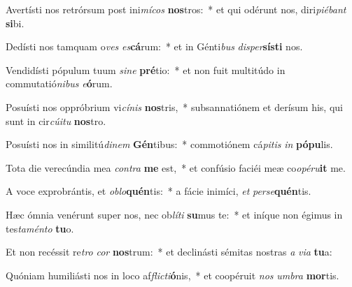 \item Avertísti nos retrórsum post ini\textit{mí}\textit{cos} \textbf{nos}tros:~* et qui odérunt nos, diri\textit{pi}\textit{é}\textit{bant} \textbf{si}bi.
\item Dedísti nos tamquam o\textit{ves} \textit{es}\textbf{cá}rum:~* et in Génti\textit{bus} \textit{di}\textit{sper}\textbf{sís}\textbf{ti} nos.
\item Vendidísti pópulum tuum \textit{si}\textit{ne} \textbf{pré}tio:~* et non fuit multitúdo in commutatió\textit{ni}\textit{bus} \textit{e}\textbf{ó}rum.
\item Posuísti nos oppróbrium vi\textit{cí}\textit{nis} \textbf{nos}tris,~* subsannatiónem et derísum his, qui sunt in cir\textit{cú}\textit{i}\textit{tu} \textbf{nos}tro.
\item Posuísti nos in similitú\textit{di}\textit{nem} \textbf{Gén}tibus:~* commotiónem cá\textit{pi}\textit{tis} \textit{in} \textbf{pó}\textbf{pu}lis.
\item Tota die verecúndia mea \textit{con}\textit{tra} \textbf{me} est,~* et confúsio faciéi meæ co\textit{o}\textit{pé}\textit{ru}\textbf{it} me.
\item A voce exprobrántis, et \textit{ob}\textit{lo}\textbf{quén}tis:~* a fácie inimíci, \textit{et} \textit{per}\textit{se}\textbf{quén}tis.
\item Hæc ómnia venérunt super nos, nec ob\textit{lí}\textit{ti} \textbf{su}mus te:~* et iníque non égimus in tes\textit{ta}\textit{mén}\textit{to} \textbf{tu}o.
\item Et non recéssit re\textit{tro} \textit{cor} \textbf{nos}trum:~* et declinásti sémitas nostras \textit{a} \textit{vi}\textit{a} \textbf{tu}a:
\item Quóniam humiliásti nos in loco af\textit{flic}\textit{ti}\textbf{ó}nis,~* et coopéruit \textit{nos} \textit{um}\textit{bra} \textbf{mor}tis.
